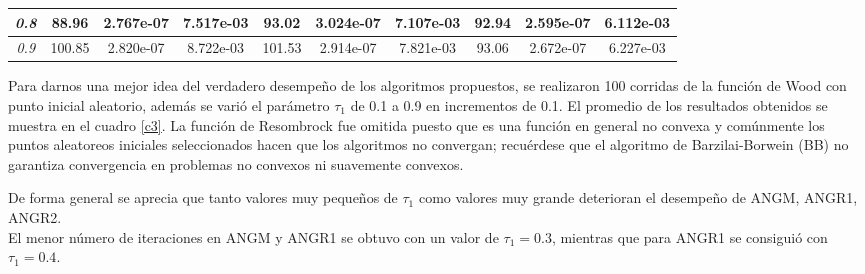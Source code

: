 \documentclass[conference]{IEEEtran}
\begin{document}
\begin{table*}[!htbp]
{\begin{tabular}{llllllllll}
    \multicolumn{1}{|c|}{\textit{ 0.8 }} & \multicolumn{1}{c|}{ 88.96 } & \multicolumn{1}{c|}{ 2.767e-07 } & \multicolumn{1}{c|}{ 7.517e-03 }& \multicolumn{1}{c|}{ 93.02 } & \multicolumn{1}{c|}{ 3.024e-07 } & \multicolumn{1}{c|}{ 7.107e-03 }& \multicolumn{1}{c|}{ 92.94 } & \multicolumn{1}{c|}{ 2.595e-07 } & \multicolumn{1}{c|}{ 6.112e-03 } \\ \hline
    \multicolumn{1}{|c|}{\textit{ 0.9 }} & \multicolumn{1}{c|}{ 100.85 } & \multicolumn{1}{c|}{ 2.820e-07 } & \multicolumn{1}{c|}{ 8.722e-03 }& \multicolumn{1}{c|}{ 101.53 } & \multicolumn{1}{c|}{ 2.914e-07 } & \multicolumn{1}{c|}{ 7.821e-03 }& \multicolumn{1}{c|}{ 93.06 } & \multicolumn{1}{c|}{ 2.672e-07 } & \multicolumn{1}{c|}{ 6.227e-03 } \\ \hline


    \end{tabular}
    }
    \end{table*}
    \FloatBarrier

    Para darnos una mejor idea del verdadero desempeño de los algoritmos propuestos, se realizaron 100 corridas de la función de Wood con punto inicial aleatorio, además se varió el parámetro $\tau_1$ de 0.1 a 0.9 en incrementos de 0.1. El promedio de los resultados obtenidos se muestra en el cuadro \ref{c3}. La función de Resombrock fue omitida puesto que es una función en general no convexa y comúnmente los puntos aleatoreos iniciales seleccionados hacen que los algoritmos no convergan; recuérdese que el algoritmo de Barzilai-Borwein (BB) no garantiza convergencia en problemas no convexos ni suavemente convexos.

    De forma general se  aprecia que tanto valores muy pequeños de $\tau_1$ como valores muy grande deterioran el desempeño de ANGM, ANGR1, ANGR2. \\

    El menor número de iteraciones en ANGM y ANGR1 se obtuvo con un valor de $\tau_1 = 0.3$, mientras que para ANGR1 se consiguió con $\tau_1 = 0.4$.\\
\end{document}
